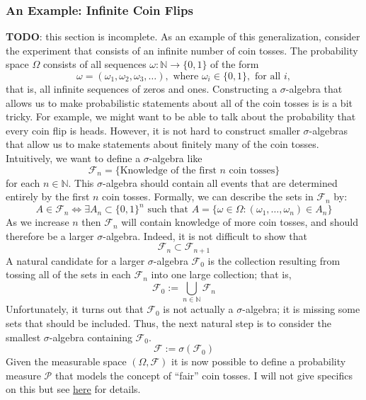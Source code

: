 \documentclass[12pt]{article}
\begin{document}
\subsubsection{An Example: Infinite Coin Flips}
\textbf{TODO}: this section is incomplete.
As an example of this generalization, consider the experiment that consists of an infinite number of coin tosses. The probability space $\Omega$ consists of all sequences $\omega: \mathbb{N} \to \{0, 1\}$ of the form 
\[\omega = (\omega_1, \omega_2, \omega_3, \dots), \text{ where } \omega_i \in \{0, 1\}, \text{ for all } i,\]
that is, all infinite sequences of zeros and ones. Constructing a $\sigma$-algebra that allows us to make probabilistic statements about all of the coin tosses is is a bit tricky. For example, we might want to be able to talk about 
the probability that every coin flip is heads. However, it is not hard to construct smaller $\sigma$-algebras that allow us to make statements about finitely many of the coin tosses. Intuitively, we want to define a $\sigma$-algebra
like 
\[\mathcal{F}_n = \{\text{Knowledge of the first $n$ coin tosses}\}\]
for each $n \in \mathbb{N}$. This $\sigma$-algebra should contain all events that are determined entirely by the first $n$ coin tosses. Formally, we can describe the sets in $\mathcal{F}_n$ by:
\[A \in \mathcal{F}_n \iff \exists A_n \subset \{0, 1\}^n \text{ such that } A = \{\omega \in \Omega: (\omega_1, \dots, \omega_n) \in A_n\}\] 
As we increase $n$ then $\mathcal{F}_n$ will contain knowledge of more coin tosses, and should therefore be a larger $\sigma$-algebra. Indeed, it is not difficult to show that 
\[\mathcal{F}_n \subset \mathcal{F}_{n + 1}\]
A natural candidate for a larger $\sigma$-algebra $\mathcal{F}_0$ is the collection resulting from tossing all of the sets in each $\mathcal{F}_n$ into one large collection; that is, 
\[\mathcal{F}_0 := \bigcup_{n \in \mathbb{N}} \mathcal{F}_n\]
Unfortunately, it turns out that $\mathcal{F}_0$ is not actually a $\sigma$-algebra; it is missing some sets that should be included. Thus, the next natural step is to consider the smallest $\sigma$-algebra containing $\mathcal{F}_0$. 
\[\mathcal{F} := \sigma(\mathcal{F}_0)\]
Given the measurable space $(\Omega, \mathcal{F})$ it is now possible to define a probability measure $\mathcal{P}$ that models the concept of ``fair'' coin tosses. I will not give specifics on this but see 
\href{https://www.ee.iitm.ac.in/~krishnaj/EE5110_files/notes/lecture8_Infinite\%20Coin\%20Toss.pdf}{here} for details. 
\end{document}
